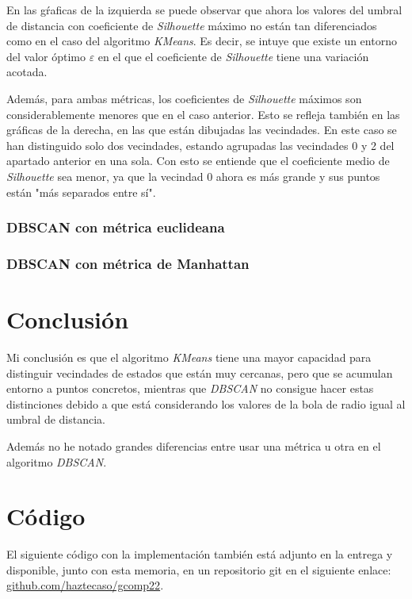 \documentclass[10pt, spanish]{article}
\theoremstyle{definition}
\theoremstyle{break}
\begin{document}
En las gŕaficas de la izquierda se puede observar que ahora los valores del
umbral de distancia con coeficiente de \textit{Silhouette} máximo no están tan
diferenciados como en el caso del algoritmo \textit{KMeans}. Es decir, se intuye
que existe un entorno del valor óptimo $\varepsilon$ en el que el coeficiente de
\textit{Silhouette} tiene una variación acotada.

Además, para ambas métricas, los coeficientes de \textit{Silhouette} máximos son
considerablemente menores que en el caso anterior. Esto se refleja también en
las gráficas de la derecha, en las que están dibujadas las vecindades. En este
caso se han distinguido solo dos vecindades, estando agrupadas las vecindades 0
y 2 del apartado anterior en una sola. Con esto se entiende que el coeficiente
medio de \textit{Silhouette} sea menor, ya que la vecindad 0 ahora es más grande y sus 
puntos están "más separados entre sí".

\subsubsection{DBSCAN con métrica euclideana}
\begin{center}
    \vspace{-1em}
    \makebox[\textwidth][c]{\scalebox{0.65}{}}
\end{center}
\subsubsection{DBSCAN con métrica de Manhattan}
\vspace{-1em}
\begin{center}
    \makebox[\textwidth][c]{\scalebox{0.65}{}}
\end{center}

\section{Conclusión}

Mi conclusión es que el algoritmo \textit{KMeans} tiene una mayor capacidad para
distinguir vecindades de estados que están muy cercanas, pero que se acumulan
entorno a puntos concretos, mientras que \textit{DBSCAN} no consigue hacer estas
distinciones debido a que está considerando los valores de la bola de radio
igual al umbral de distancia.

Además no he notado grandes diferencias entre usar una métrica u otra en el
algoritmo \textit{DBSCAN}.

\section{Código}

El siguiente código con la implementación también está adjunto en la entrega
y disponible, junto con esta memoria, en un repositorio git en el siguiente
enlace:
\href{https://www.github.com/haztecaso/gcomp22}{github.com/haztecaso/gcomp22}.
\vspace{1em}


\end{document}

